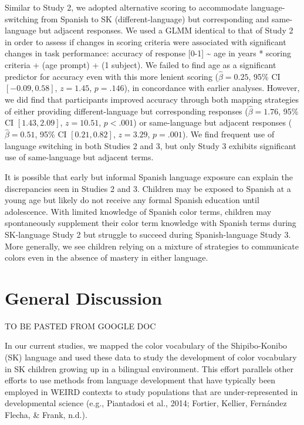\documentclass[
  english,
  ,man,floatsintext]{apa6}
\begin{document}
Similar to Study 2, we adopted alternative scoring to accommodate language-switching from Spanish to SK (different-language) but corresponding and same-language but adjacent responses. We used a GLMM identical to that of Study 2 in order to assess if changes in scoring criteria were associated with significant changes in task performance: accuracy of response {[}0-1{]} \textasciitilde{} age in years * scoring criteria + (age \textbar{} prompt) + (1 \textbar{} subject). We failed to find age as a significant predictor for accuracy even with this more lenient scoring (\(\hat{\beta} = 0.25\), 95\% CI \([-0.09, 0.58]\), \(z = 1.45\), \(p = .146\)), in concordance with earlier analyses. However, we did find that participants improved accuracy through both mapping strategies of either providing different-language but corresponding responses (\(\hat{\beta} = 1.76\), 95\% CI \([1.43, 2.09]\), \(z = 10.51\), \(p < .001\)) or same-language but adjacent responses (\(\hat{\beta} = 0.51\), 95\% CI \([0.21, 0.82]\), \(z = 3.29\), \(p = .001\)). We find frequent use of language switching in both Studies 2 and 3, but only Study 3 exhibits significant use of same-language but adjacent terms.

It is possible that early but informal Spanish language exposure can explain the discrepancies seen in Studies 2 and 3. Children may be exposed to Spanish at a young age but likely do not receive any formal Spanish education until adolescence. With limited knowledge of Spanish color terms, children may spontaneously supplement their color term knowledge with Spanish terms during SK-language Study 2 but struggle to succeed during Spanish-language Study 3. More generally, we see children relying on a mixture of strategies to communicate colors even in the absence of mastery in either language.

\hypertarget{general-discussion}{%
\section{General Discussion}\label{general-discussion}}

TO BE PASTED FROM GOOGLE DOC

In our current studies, we mapped the color vocabulary of the Shipibo-Konibo (SK) language and used these data to study the development of color vocabulary in SK children growing up in a bilingual environment. This effort parallels other efforts to use methods from language development that have typically been employed in WEIRD contexts to study populations that are under-represented in developmental science (e.g., Piantadosi et al., 2014; Fortier, Kellier, Fernández Flecha, \& Frank, n.d.).
\end{document}
